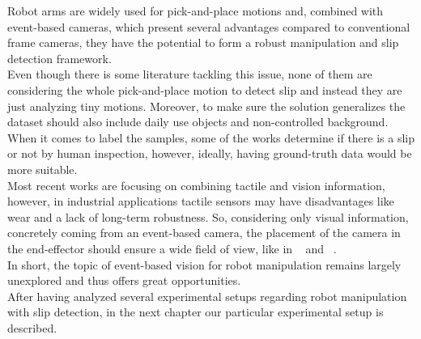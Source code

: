 Robot arms are widely used for pick-and-place motions and, combined with event-based cameras, which present several advantages compared to conventional frame cameras, they have the potential to form a robust manipulation and slip detection framework.\\

Even though there is some literature tackling this issue, none of them are considering the whole pick-and-place motion to detect slip and instead they are just analyzing tiny motions. Moreover, to make sure the solution generalizes the dataset should also include daily use objects and non-controlled background. When it comes to label the samples, some of the works determine if there is a slip or not by human inspection, however, ideally, having ground-truth data would be more suitable.\\

Most recent works are focusing on combining tactile and vision information, however, in industrial applications tactile sensors may have disadvantages like wear and a lack of long-term robustness. So, considering only visual information, concretely coming from an event-based camera, the placement of the camera in the end-effector should ensure a wide field of view, like in ~\cite{gelsight2018} and ~\cite{rss2020}.\\

In short, the topic of event-based vision for robot manipulation remains largely unexplored and thus offers great opportunities.\\

After having analyzed several experimental setups regarding robot manipulation with slip detection, in the next chapter our particular experimental setup is described.
